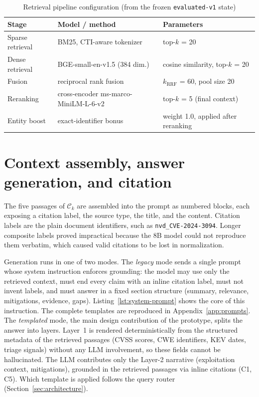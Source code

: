 \begin{table}[H]
    \centering
    \small
    \begin{tabular}{llp{}}
        \toprule
        \textbf{Stage} & \textbf{Model / method} & \textbf{Parameters} \\
        \midrule
        Sparse retrieval & BM25, CTI-aware tokenizer & top-$k$ = 20 \\
        Dense retrieval & BGE-small-en-v1.5 (384 dim.) & cosine similarity,
            top-$k$ = 20 \\
        Fusion & reciprocal rank fusion & $k_{\mathrm{RRF}}$ = 60,
            pool size 20 \\
        Reranking & cross-encoder ms-marco-MiniLM-L-6-v2 & top-$k$ = 5
            (final context) \\
        Entity boost & exact-identifier bonus & weight 1.0, applied after
            reranking \\
        \bottomrule
    \end{tabular}
    \caption{Retrieval pipeline configuration (from the frozen
             \texttt{evaluated-v1} state)}
    \label{tab:retrieval-config}
\end{table}

\section{Context assembly, answer generation, and citation}
\label{sec:generation}

The five passages of $\mathcal{C}_k$ are assembled into the prompt as
numbered blocks, each exposing a citation label, the source type, the
title, and the content. Citation labels are the plain document
identifiers, such as \texttt{nvd\_CVE-2024-3094}. Longer composite labels
proved impractical because the 8B model could not reproduce them
verbatim, which caused valid citations to be lost in normalization.

Generation runs in one of two modes. The \emph{legacy} mode sends a
single prompt whose system instruction enforces grounding: the model may
use only the retrieved context, must end every claim with an inline
citation label, must not invent labels, and must answer in a fixed
section structure (summary, relevance, mitigations, evidence, gaps).
Listing~\ref{lst:system-prompt} shows the core of this instruction. The
complete templates are reproduced in Appendix~\ref{app:prompts}. The
\emph{templated} mode, the main design contribution of the prototype,
splits the answer into layers. Layer~1 is rendered deterministically from
the structured metadata of the retrieved passages (CVSS scores, CWE
identifiers, KEV dates, triage signals) without any LLM involvement, so
these fields cannot be hallucinated. The LLM contributes only the Layer-2
narrative (exploitation context, mitigations), grounded in the retrieved
passages via inline citations (C1, C5). Which template is applied follows
the query router (Section~\ref{sec:architecture}).

